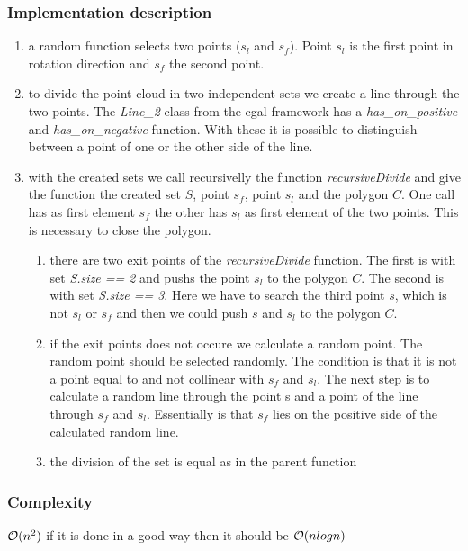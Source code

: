 \subsubsection{Implementation description}
\begin{enumerate}
  \item a random function selects two points ($s_l$ and $s_f$). Point $s_l$ is the
    first point in rotation direction and $s_f$ the second point.
  \item to divide the point cloud in two independent sets we create a
    line through the two points. The \textit{Line\_2} class from the cgal
    framework has a \textit{has\_on\_positive} and \textit{has\_on\_negative} function.
    With these it is possible to distinguish between a point of one or
    the other side of the line.
  \item with the created sets we call recursivelly the function
    \textit{recursiveDivide} and give the function the created set $S$, point $s_f$,
    point $s_l$ and the polygon $C$. One call has as first element $s_f$ the other has $s_l$
    as first element of the two points. This is necessary to close the
    polygon.
  \begin{enumerate}
    \item there are two exit points of the \textit{recursiveDivide} function.
      The first is with set \textit{S.size == 2} and pushs the point $s_l$ to the
      polygon $C$. The second is with set \textit{S.size == 3}. Here we have to
      search the third point $s$, which is not $s_l$ or $s_f$ and then we
      could push $s$ and $s_l$ to the polygon $C$.
    \item if the exit points does not occure we calculate a random
      point. The random point should be selected randomly. The
      condition is that it is not a point equal to and not collinear
      with $s_f$ and $s_l$. The next step is to calculate a random line
      through the point s and a point of the line through $s_f$ and
      $s_l$. Essentially is that $s_f$ lies on the positive side of the
      calculated random line.
    \item the division of the set is equal as in the parent function
  \end{enumerate}
\end{enumerate}

\subsubsection{Complexity}
$\mathcal{O}(n^2)$ if it is done in a good way then it should be $\mathcal{O}(nlogn)$

